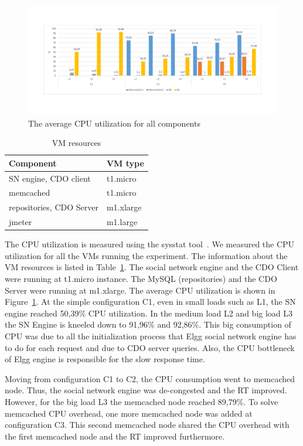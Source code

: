 \begin{figure}[h]
	\centering
	\includegraphics[width=1.1\textwidth]{./fig/UsageAVG.pdf} 
	\caption{The average CPU utilization for all components}
	\label{fig:cpuavg}
\end{figure}

\begin{table}[bp] 
\centering
\begin{tabular}{|l|l|}
\hline
 Component &  VM type \\ \hline
 SN engine, CDO client &  t1.micro \\ \hline
 memcached &  t1.micro \\ \hline
 repositories, CDO Server &  m1.xlarge \\ \hline
 jmeter &  m1.large \\ \hline
\end{tabular}
\caption{VM resources}
\label{vms_resources}
\end{table}

The CPU utilization is measured using the sysstat tool~\cite{sysstat_url}. We measured the CPU utilization for all the VMs running the experiment. The information about the VM resources is listed in Table~\ref{vms_resources}. The social network engine and the CDO Client were running at t1.micro instance. The MySQL (repositories) and the CDO Server were running at m1.xlarge. The average CPU utilization is shown in Figure~\ref{fig:cpuavg}. At the simple configuration C1, even in small loads such as L1, the SN engine reached 50,39\% CPU utilization. In the medium load L2 and big load L3 the SN Engine is kneeled down to 91,96\% and 92,86\%. This big consumption of CPU was due to all the initialization process that Elgg social network engine has to do for each request and due to CDO server queries. Also, the CPU bottleneck of Elgg engine is responsible for the slow response time.

Moving from configuration C1 to C2, the CPU consumption went to memcached node. Thus, the social network engine was de-congested and the RT improved. However, for the big load L3 the memcached node reached 89,79\%. To solve memcached CPU overhead, one more memcached node was added at configuration C3. This second memcached node shared the CPU overhead with the first memcached node and the RT improved furthermore. 

